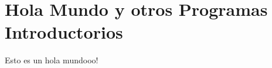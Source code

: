 \documentclass[../main.tex]{subfiles}
\begin{document}
\section{Hola Mundo y otros Programas Introductorios}
Esto es un hola mundooo!
\clearpage
\end{document}
